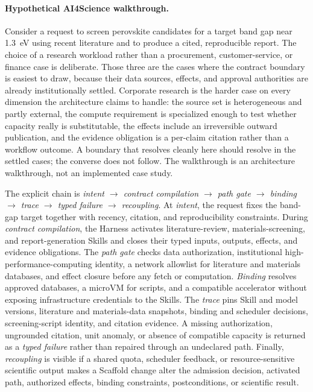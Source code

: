 \documentclass[11pt]{article}
\begin{document}
\paragraph{Hypothetical AI4Science walkthrough.}
Consider a request to screen perovskite candidates for a target band gap near 1.3~eV using recent literature and to produce a cited, reproducible report. The choice of a research workload rather than a procurement, customer-service, or finance case is deliberate. Those three are the cases where the contract boundary is easiest to draw, because their data sources, effects, and approval authorities are already institutionally settled. Corporate research is the harder case on every dimension the architecture claims to handle: the source set is heterogeneous and partly external, the compute requirement is specialized enough to test whether capacity really is substitutable, the effects include an irreversible outward publication, and the evidence obligation is a per-claim citation rather than a workflow outcome. A boundary that resolves cleanly here should resolve in the settled cases; the converse does not follow. The walkthrough is an architecture walkthrough, not an implemented case study.

The explicit chain is \textit{intent $\rightarrow$ contract compilation $\rightarrow$ path gate $\rightarrow$ binding $\rightarrow$ trace $\rightarrow$ typed failure $\rightarrow$ recoupling}. At \textit{intent}, the request fixes the band-gap target together with recency, citation, and reproducibility constraints. During \textit{contract compilation}, the Harness activates literature-review, materials-screening, and report-generation Skills and closes their typed inputs, outputs, effects, and evidence obligations. The \textit{path gate} checks data authorization, institutional high-performance-computing identity, a network allowlist for literature and materials databases, and effect closure before any fetch or computation. \textit{Binding} resolves approved databases, a microVM for scripts, and a compatible accelerator without exposing infrastructure credentials to the Skills. The \textit{trace} pins Skill and model versions, literature and materials-data snapshots, binding and scheduler decisions, screening-script identity, and citation evidence. A missing authorization, ungrounded citation, unit anomaly, or absence of compatible capacity is returned as a \textit{typed failure} rather than repaired through an undeclared path. Finally, \textit{recoupling} is visible if a shared quota, scheduler feedback, or resource-sensitive scientific output makes a Scaffold change alter the admission decision, activated path, authorized effects, binding constraints, postconditions, or scientific result.
\end{document}

